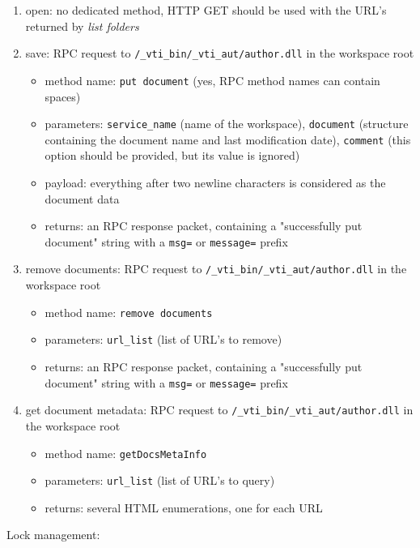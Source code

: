 \begin{enumerate}
\item open: no dedicated method, HTTP GET should be used with the URL's returned by \emph{list folders}
\item save: RPC request to \texttt{/\_vti\_bin/\_vti\_aut/author.dll} in the workspace root
\begin{itemize}
\item method name: \texttt{put document} (yes, RPC method names can contain spaces)
\item parameters: \texttt{service\_name} (name of the workspace), \texttt{document} (structure containing the document name and last modification date), \texttt{comment} (this option should be provided, but its value is ignored)
\item payload: everything after two newline characters is considered as the document data
\item returns: an RPC response packet, containing a "successfully put document" string with a \texttt{msg=} or \texttt{message=} prefix
\end{itemize}

\item remove documents: RPC request to \texttt{/\_vti\_bin/\_vti\_aut/author.dll} in the workspace root
\begin{itemize}
\item method name: \texttt{remove documents}
\item parameters: \texttt{url\_list} (list of URL's to remove)
\item returns: an RPC response packet, containing a "successfully put document" string with a \texttt{msg=} or \texttt{message=} prefix
\end{itemize}

\item get document metadata: RPC request to \texttt{/\_vti\_bin/\_vti\_aut/author.dll} in the workspace root
\begin{itemize}
\item method name: \texttt{getDocsMetaInfo}
\item parameters: \texttt{url\_list} (list of URL's to query)
\item returns: several HTML enumerations, one for each URL
\end{itemize}
\end{enumerate}

Lock management:

